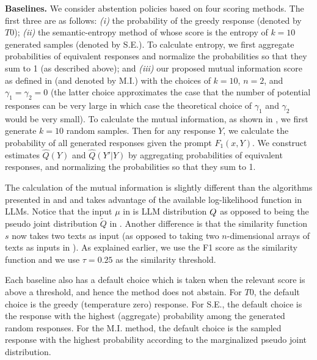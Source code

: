 \documentclass[a4paper]{article}
\theoremstyle{plain}
\theoremstyle{definition}
\theoremstyle{plain}
\begin{document}
\textbf{Baselines.} We consider abstention policies based on four scoring methods. The first three are as follows: \emph{(i)} the probability of the greedy response (denoted by $T0$); \emph{(ii)} the semantic-entropy method of \citet{KuhnARXIV2023} whose score is the entropy of $k=10$ generated samples (denoted by S.E.). To calculate entropy, we first aggregate probabilities of equivalent responses and normalize the probabilities so that they sum to 1 (as described above); and \emph{(iii)} our proposed mutual information score as defined in  (and denoted by M.I.) with the choices of $k=10$, $n=2$, and $\gamma_1=\gamma_2=0$ (the latter choice approximates the case that the number of potential responses can be very large in which case the theoretical choice of $\gamma_1$ and $\gamma_2$ would be very small). To calculate the mutual information, as shown in , we first generate $k=10$ random samples. Then for any response $Y$, we calculate the probability of all generated responses given the prompt $F_1(x,Y)$. We construct estimates $\widehat Q(Y)$ and $\widehat Q(Y'|Y)$ by aggregating probabilities of equivalent responses, and normalizing the probabilities so that they sum to 1. 

The calculation of the mutual information is slightly different than the algorithms presented in  and  and takes advantage of the available log-likelihood function in LLMs. Notice that the input $\mu$ in  is LLM distribution $Q$ as opposed to being the pseudo joint distribution $\widetilde Q$ in . Another difference is that the similarity function $s$ now takes two texts as input (as opposed to taking two $n$-dimensional arrays of texts as inputs in ). As explained earlier, we use the F1 score as the similarity function and we use $\tau=0.25$ as the similarity threshold. 

Each baseline also has a default choice which is taken when the relevant score is above a threshold, and hence the method does not abstain. For $T0$, the default choice is the greedy (temperature zero) response. For S.E., the default choice is the response with the highest (aggregate) probability among the generated random responses. 
For the M.I. method, the default choice is the sampled response with the highest probability according to the marginalized pseudo joint distribution.    
\end{document}
